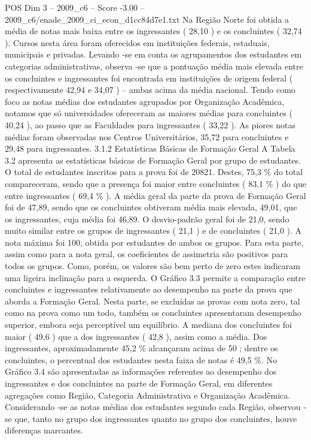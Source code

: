 \begin{textsample}{POS Dim 3 – 2009\_c6 – Score -3.00 – 2009\_c6/enade\_2009\_ci\_econ\_d1cc84d7e1.txt}
Na Região Norte foi obtida a média de notas mais baixa entre os ingressantes ( 28,10 ) e os concluintes ( 32,74 ).
Cursos nesta área foram oferecidos em instituições federais, estaduais, municipais e privadas.
Levando -se em conta os agrupamentos dos estudantes em categorias administrativas, observa -se que a pontuação média mais elevada entre os concluintes e ingressantes foi encontrada em instituições de origem federal ( respectivamente 42,94 e 34,07 ) – ambas acima da média nacional.
Tendo como foco as notas médias dos estudantes agrupados por Organização Acadêmica, notamos que só universidades ofereceram as maiores médias para concluintes ( 40,24 ), ao passo que as Faculdades para ingressantes ( 33,22 ).
As piores notas médias foram observadas nos Centros Universitários, 35,72 para concluintes e 29,48 para ingressantes. 3.1.2 Estatísticas Básicas de Formação Geral A Tabela 3.2 apresenta as estatísticas básicas de Formação Geral por grupo de estudantes.
O total de estudantes inscritos para a prova foi de 20821.
Destes, 75,3 \% do total compareceram, sendo que a presença foi maior entre concluintes ( 83,1 \% ) do que entre ingressantes ( 69,4 \% ).
A média geral da parte da prova de Formação Geral foi de 47,89, sendo que os concluintes obtiveram média mais elevada, 49,01, que os ingressantes, cuja média foi 46,89.
O desvio-padrão geral foi de 21,0, sendo muito similar entre os grupos de ingressantes ( 21,1 ) e de concluintes ( 21,0 ).
A nota máxima foi 100, obtida por estudantes de ambos os grupos.
Para esta parte, assim como para a nota geral, os coeficientes de assimetria são positivos para todos os grupos.
Como, porém, os valores são bem perto de zero estes indicaram uma ligeira inclinação para a esquerda.
O Gráfico 3.3 permite a comparação entre concluintes e ingressantes relativamente ao desempenho na parte da prova que aborda a Formação Geral.
Nesta parte, se excluídas as provas com nota zero, tal como na prova como um todo, também os concluintes apresentaram desempenho superior, embora seja perceptível um equilíbrio.
A mediana dos concluintes foi maior ( 49,6 ) que a dos ingressantes ( 42,8 ), assim como a média.
Dos ingressantes, aproximadamente 45,2 \% alcançaram acima de 50 ; dentre os concluintes, o percentual dos estudantes nesta faixa de notas é 49,5 \%.
No Gráfico 3.4 são apresentadas as informações referentes ao desempenho dos ingressantes e dos concluintes na parte de Formação Geral, em diferentes agregações como Região, Categoria Administrativa e Organização Acadêmica.
Considerando -se as notas médias dos estudantes segundo cada Região, observou -se que, tanto no grupo dos ingressantes quanto no grupo dos concluintes, houve diferenças marcantes.

\end{textsample}
